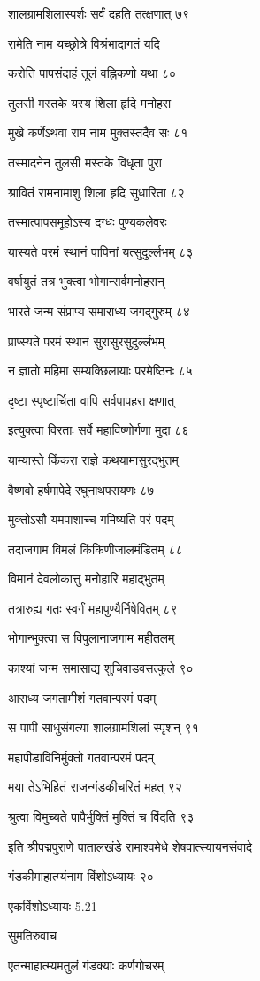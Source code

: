 शालग्रामशिलास्पर्शः सर्वं दहति तत्क्षणात् ७९

रामेति नाम यच्छ्रोत्रे विश्रंभादागतं यदि

करोति पापसंदाहं तूलं वह्निकणो यथा ८०

तुलसी मस्तके यस्य शिला हृदि मनोहरा

मुखे कर्णेऽथवा राम नाम मुक्तस्तदैव सः ८१

तस्मादनेन तुलसी मस्तके विधृता पुरा

श्रावितं रामनामाशु शिला हृदि सुधारिता ८२

तस्मात्पापसमूहोऽस्य दग्धः पुण्यकलेवरः

यास्यते परमं स्थानं पापिनां यत्सुदुर्ल्लभम् ८३

वर्षायुतं तत्र भुक्त्वा भोगान्सर्वमनोहरान्

भारते जन्म संप्राप्य समाराध्य जगद्गुरुम् ८४

प्राप्स्यते परमं स्थानं सुरासुरसुदुर्ल्लभम्

न ज्ञातो महिमा सम्यक्छिलायाः परमेष्ठिनः ८५

दृष्टा स्पृष्टार्चिता वापि सर्वपापहरा क्षणात्

इत्युक्त्वा विरताः सर्वे महाविष्णोर्गणा मुदा ८६

याम्यास्ते किंकरा राज्ञे कथयामासुरद्भुतम्

वैष्णवो हर्षमापेदे रघुनाथपरायणः ८७

मुक्तोऽसौ यमपाशाच्च गमिष्यति परं पदम्

तदाजगाम विमलं किंकिणीजालमंडितम् ८८

विमानं देवलोकात्तु मनोहारि महाद्भुतम्

तत्रारुह्य गतः स्वर्गं महापुण्यैर्निषेवितम् ८९

भोगान्भुक्त्वा स विपुलानाजगाम महीतलम्

काश्यां जन्म समासाद्य शुचिवाडवसत्कुले ९०

आराध्य जगतामीशं गतवान्परमं पदम्

स पापी साधुसंगत्या शालग्रामशिलां स्पृशन् ९१

महापीडाविनिर्मुक्तो गतवान्परमं पदम्

मया तेऽभिहितं राजन्गंडकीचरितं महत् ९२

श्रुत्वा विमुच्यते पापैर्भुक्तिं मुक्तिं च विंदति ९३

इति श्रीपद्मपुराणे पातालखंडे रामाश्वमेधे शेषवात्स्यायनसंवादे

गंडकीमाहात्म्यंनाम विंशोऽध्यायः २०

एकविंशोऽध्यायः 5.21

सुमतिरुवाच

एतन्माहात्म्यमतुलं गंडक्याः कर्णगोचरम्

